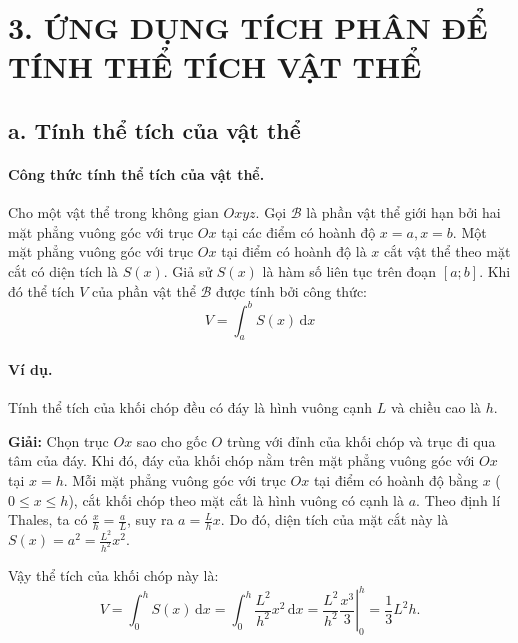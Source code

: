 \section*{3. ỨNG DỤNG TÍCH PHÂN ĐỂ TÍNH THỂ TÍCH VẬT THỂ}

\subsection*{a. Tính thể tích của vật thể}

\paragraph{Công thức tính thể tích của vật thể.} 
Cho một vật thể trong không gian $Oxyz$. Gọi $\mathcal{B}$ là phần vật thể giới hạn bởi hai mặt phẳng vuông góc với trục $Ox$ tại các điểm có hoành độ $x = a, x = b$. Một mặt phẳng vuông góc với trục $Ox$ tại điểm có hoành độ là $x$ cắt vật thể theo mặt cắt có diện tích là $S(x)$. Giả sử $S(x)$ là hàm số liên tục trên đoạn $[a; b]$. Khi đó thể tích $V$ của phần vật thể $\mathcal{B}$ được tính bởi công thức:
\[
V = \int_{a}^{b} S(x) \, \mathrm{d}x
\]

\paragraph{Ví dụ.} Tính thể tích của khối chóp đều có đáy là hình vuông cạnh $L$ và chiều cao là $h$.

\noindent\textbf{Giải:} 
Chọn trục $Ox$ sao cho gốc $O$ trùng với đỉnh của khối chóp và trục đi qua tâm của đáy. Khi đó, đáy của khối chóp nằm trên mặt phẳng vuông góc với $Ox$ tại $x = h$. 
Mỗi mặt phẳng vuông góc với trục $Ox$ tại điểm có hoành độ bằng $x$ ($0 \le x \le h$), cắt khối chóp theo mặt cắt là hình vuông có cạnh là $a$. 
Theo định lí Thales, ta có $\frac{x}{h} = \frac{a}{L}$, suy ra $a = \frac{L}{h}x$. 
Do đó, diện tích của mặt cắt này là $S(x) = a^2 = \frac{L^2}{h^2}x^2$. 

Vậy thể tích của khối chóp này là:
\[
V = \int_{0}^{h} S(x) \, \mathrm{d}x = \int_{0}^{h} \frac{L^2}{h^2}x^2 \, \mathrm{d}x = \left. \frac{L^2}{h^2} \frac{x^3}{3} \right|_{0}^{h} = \frac{1}{3}L^2h.
\]

